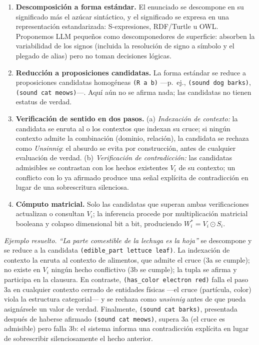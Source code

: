 \documentclass{article}
\providecommand{\tightlist}{%
  \setlength{\itemsep}{0pt}\setlength{\parskip}{0pt}}
\begin{document}
\begin{enumerate}
\def\labelenumi{\arabic{enumi}.}
\tightlist
\item
  \textbf{Descomposición a forma estándar.} El enunciado se descompone
  en su significado más el azúcar sintáctico, y el significado se
  expresa en una representación estandarizada: S-expresiones, RDF/Turtle
  u OWL. Proponemos LLM pequeños como descomponedores de superficie:
  absorben la variabilidad de los signos (incluida la resolución de
  signo a símbolo y el plegado de alias) pero no toman decisiones
  lógicas.
\item
  \textbf{Reducción a proposiciones candidatas.} La forma estándar se
  reduce a proposiciones candidatas homogéneas \texttt{(R\ a\ b)}
  ---p.~ej., \texttt{(sound\ dog\ barks)},
  \texttt{(sound\ cat\ meows)}---. Aquí aún no se afirma nada; las
  candidatas no tienen estatus de verdad.
\item
  \textbf{Verificación de sentido en dos pasos.} (a) \emph{Indexación de
  contexto:} la candidata se enruta al o los contextos que indexan su
  cruce; si ningún contexto admite la combinación (dominio, relación),
  la candidata se rechaza como \emph{Unsinnig}: el absurdo se evita por
  construcción, antes de cualquier evaluación de verdad. (b)
  \emph{Verificación de contradicción:} las candidatas admisibles se
  contrastan con los hechos existentes \(V_i\) de su contexto; un
  conflicto con lo ya afirmado produce una señal explícita de
  contradicción en lugar de una sobrescritura silenciosa.
\item
  \textbf{Cómputo matricial.} Solo las candidatas que superan ambas
  verificaciones actualizan o consultan \(V_i\); la inferencia procede
  por multiplicación matricial booleana y colapso dimensional bit a bit,
  produciendo \(W_i^{*} = V_i \odot S_i\).
\end{enumerate}

\emph{Ejemplo resuelto.} \emph{``La parte comestible de la lechuga es la
hoja''} se descompone y se reduce a la candidata
\texttt{(edible\_part\ lettuce\ leaf)}. La indexación de contexto la
enruta al contexto de alimentos, que admite el cruce (3a se cumple); no
existe en \(V_i\) ningún hecho conflictivo (3b se cumple); la tupla se
afirma y participa en la clausura. En contraste,
\texttt{(has\_color\ electron\ red)} falla el paso 3a en cualquier
contexto cerrado de entidades físicas ---el cruce (partícula, color)
viola la estructura categorial--- y se rechaza como \emph{unsinnig}
antes de que pueda asignársele un valor de verdad. Finalmente,
\texttt{(sound\ cat\ barks)}, presentada después de haberse afirmado
\texttt{(sound\ cat\ meows)}, supera 3a (el cruce es admisible) pero
falla 3b: el sistema informa una contradicción explícita en lugar de
sobrescribir silenciosamente el hecho anterior.
\end{document}

